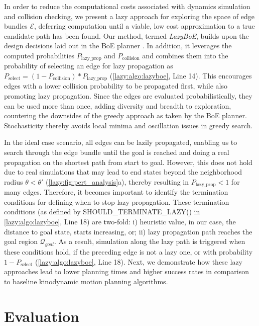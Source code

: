 In order to reduce the computational costs associated with dynamics simulation and collision checking, we present a lazy approach for exploring the space of edge bundles $\mathcal{E}$, deferring computation until a viable, low cost approximation to a true candidate path has been found.
Our method, termed \textsl{LazyBoE}, builds upon the design decisions laid out in the BoE planner \cite{shome2021asymptotically}. In addition, it leverages the computed probabilities $P_{\text{lazy\_prop}}$ and $P_{\text{collision}}$ and combines them into the probability of selecting an edge for lazy propagation as $P_{\text{select}} = (1 - P_{\text{collision}}) * P_{\text{lazy\_prop}}$ (\cref{lazy:algo:lazyboe}, Line 14). This encourages edges with a lower collision probability to be propagated first, while also promoting lazy propagation. Since the edges are evaluated probabilistically, they can be used more than once, adding diversity and breadth to exploration, countering the downsides of the greedy approach as taken by the BoE planner. Stochasticity thereby avoids local minima and oscillation issues in greedy search.

In the ideal case scenario, all edges can be lazily propagated, enabling us to search through the edge bundle until the goal is reached and doing a real propagation on the shortest path from start to goal. However, this does not hold due to real simulations that may lead to end states beyond the neighborhood radius $\theta < \theta'$ (\cref{lazy:fig:pert_analysis}a), thereby resulting in $P_{\text{lazy\_prop}} < 1$ for many edges. Therefore, it becomes important to identify the termination conditions for defining when to stop lazy propagation. These termination conditions (as defined by SHOULD\_TERMINATE\_LAZY() in \cref{lazy:algo:lazyboe}, Line 18) are two-fold: i) heuristic value, in our case, the distance to goal state, starts increasing, or; ii) lazy propagation path reaches the goal region $\mathcal{Q}_{goal}$.
As a result, simulation along the lazy path is triggered when these conditions hold, if the preceding edge is not a lazy one, or with probability $1 - P_{\text{select}}$ (\cref{lazy:algo:lazyboe}, Line 18).
Next, we demonstrate how these lazy approaches lead to lower planning times and higher success rates in comparison to baseline kinodynamic motion planning algorithms.

\section{Evaluation}
\label{sec:multiquery:results}

